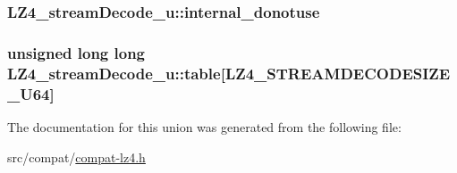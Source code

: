 \subsubsection[{internal\+\_\+donotuse}]{ L\+Z4\+\_\+stream\+Decode\+\_\+u\+::internal\+\_\+donotuse}\label{union_l_z4__stream_decode__u_a4ee7ad9d157b314d88fd901d35116c76}
\hypertarget{union_l_z4__stream_decode__u_ae208ed637966bd87b22917d46987af09}{}
\subsubsection[{table}]{\setlength{\rightskip}{0pt plus 5cm}unsigned long long L\+Z4\+\_\+stream\+Decode\+\_\+u\+::table\mbox{[}{\bf L\+Z4\+\_\+\+S\+T\+R\+E\+A\+M\+D\+E\+C\+O\+D\+E\+S\+I\+Z\+E\+\_\+\+U64}\mbox{]}}\label{union_l_z4__stream_decode__u_ae208ed637966bd87b22917d46987af09}


The documentation for this union was generated from the following file\+:\begin{DoxyCompactItemize}
\item 
src/compat/\hyperlink{compat-lz4_8h}{compat-\/lz4.\+h}\end{DoxyCompactItemize}

